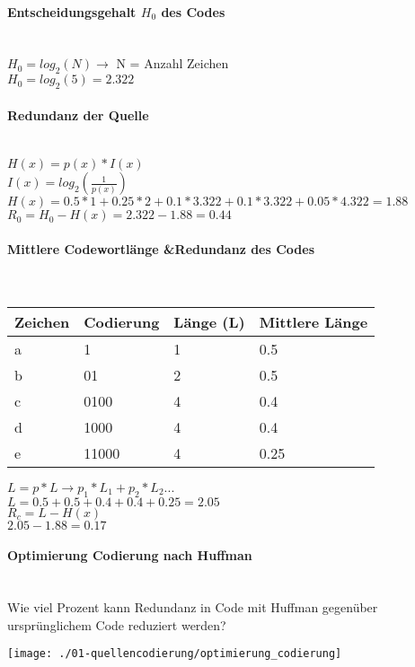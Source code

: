 \paragraph{Entscheidungsgehalt $H_0$ des Codes}\mbox{}\\
$H_0=log_2(N) \rightarrow$ N = Anzahl Zeichen\\
$H_0=log_2(5)=2.322$

\paragraph{Redundanz der Quelle}\mbox{}\\
$H(x) = p(x)*I(x)$\\
$I(x) = log_2(\frac{1}{p(x)})$\\
$H(x) = 0.5*1+0.25*2+0.1*3.322+0.1*3.322+0.05*4.322=1.88$
$R_0 = H_0 - H(x) = 2.322-1.88=0.44$

\paragraph{Mittlere Codewortlänge \&Redundanz des Codes}\mbox{}\\
\begin{center}
    \centering
    \begin{tabular}{p{1cm} | p{1.5cm} | p{1.5cm} | p{1.25cm}}
        \bfseries{Zeichen} & \bfseries{Codierung} & \bfseries{Länge (L)} & \bfseries{Mittlere Länge}\\ \hline
        a & 1 & 1 & 0.5\\ 
        b & 01 & 2 & 0.5\\
        c & 0100 & 4 & 0.4\\
        d & 1000 & 4 & 0.4\\
        e & 11000 & 4 & 0.25
    \end{tabular}
\end{center}
$L = p*L \rightarrow p_1*L_1+p_2*L_2...$\\
$L=0.5+0.5+0.4+0.4+0.25=2.05$\\
$R_c = L - H(x)$\\
$2.05-1.88=0.17$

\paragraph{Optimierung Codierung nach Huffman}\mbox{}\\
Wie viel Prozent kann Redundanz in Code mit Huffman gegenüber ursprünglichem Code reduziert werden?\\
\begin{center}
    \vspace{-8pt}
    \texttt{[image: ./01-quellencodierung/optimierung\_codierung]}
    \vspace{-8pt}
\end{center}

